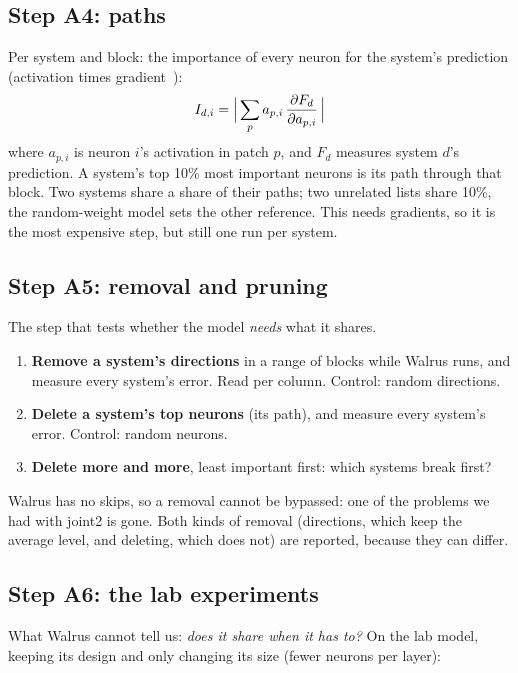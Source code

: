 \documentclass[11pt,a4paper]{article}
\begin{document}
\subsection*{Step A4: paths}

Per system and block: the importance of every neuron for the system's prediction (activation times gradient~\cite{dhamdhere2019}):
\begin{equation*}
  I_{d,i} = \Bigl|\, \sum_{p} a_{p,i}\, \frac{\partial F_d}{\partial a_{p,i}} \,\Bigr|
\end{equation*}
where $a_{p,i}$ is neuron $i$'s activation in patch $p$, and $F_d$ measures system $d$'s prediction.
A system's top 10\% most important neurons is its path through that block. Two systems share a share of their paths;
two unrelated lists share 10\%, the random-weight model sets the other reference.
This needs gradients, so it is the most expensive step, but still one run per system.

\subsection*{Step A5: removal and pruning}

The step that tests whether the model \emph{needs} what it shares.
\begin{enumerate}[itemsep=0.5em]
  \item \textbf{Remove a system's directions} in a range of blocks while Walrus runs, and measure every system's error.
  Read per column. Control: random directions.
  \item \textbf{Delete a system's top neurons} (its path), and measure every system's error. Control: random neurons.
  \item \textbf{Delete more and more}, least important first: which systems break first?
\end{enumerate}
Walrus has no skips, so a removal cannot be bypassed: one of the problems we had with joint2 is gone.
Both kinds of removal (directions, which keep the average level, and deleting, which does not) are reported, because they can differ.

\subsection*{Step A6: the lab experiments}

What Walrus cannot tell us: \emph{does it share when it has to?}
On the lab model, keeping its design and only changing its size (fewer neurons per layer):
\end{document}
